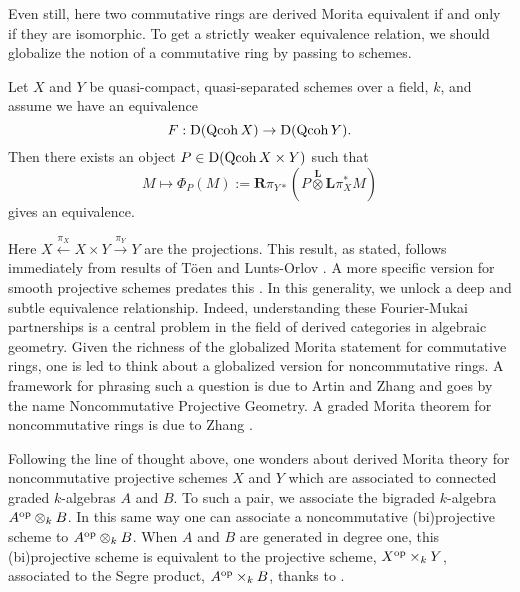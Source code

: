\documentclass[dissertation.tex]{subfiles}
\begin{document}
Even still, here two commutative rings are derived Morita equivalent if and only if they are isomorphic. To get a strictly weaker equivalence relation, we should globalize the notion of a commutative ring by passing to schemes. 

\begin{theorem}
  Let \(X\) and \(Y\) be quasi-compact, quasi-separated schemes over a field, \(k\), and assume we have an equivalence 
  \begin{displaymath}
    F: \mathrm{D}(\operatorname{Qcoh}X) \to \mathrm{D}(\operatorname{Qcoh}Y).
  \end{displaymath}
  Then there exists an object \(P \in \mathrm{D}(\operatorname{Qcoh}X \times Y)\) such that
  \begin{displaymath}
    M \mapsto \Phi_P (M) := \mathbf{R}\pi_{Y \ast} \left( P \overset{\mathbf{L}}{\otimes} \mathbf{L}\pi_X^\ast M \right) 
  \end{displaymath}
  gives an equivalence. 
\end{theorem}

Here \(X \overset{\pi_X}\longleftarrow X \times Y \overset{\pi_Y}\longrightarrow Y\) are the projections. This result, as stated, follows immediately from results of T\"oen and Lunts-Orlov \cite{Toen,Lunts-Orlov}. A more specific version for smooth projective schemes predates this \cite{Orlov}. In this generality, we unlock a deep and subtle equivalence relationship. Indeed, understanding these Fourier-Mukai partnerships is a central problem in the field of derived categories in algebraic geometry. 
Given the richness of the globalized Morita statement for commutative rings, one is led to think about a globalized version for noncommutative rings. A framework for phrasing such a question is due to Artin and Zhang \cite{AZ} and goes by the name Noncommutative Projective Geometry. A graded Morita theorem for noncommutative rings is due to Zhang \cite{Zhang}.  


Following the line of thought above, one wonders about derived Morita theory for noncommutative projective schemes \(X\) and \(Y\) which are associated to connected graded \(k\)-algebras \(A\) and \(B\). To such a pair, we associate the bigraded \(k\)-algebra \(A^{\operatorname{op}} \otimes_k B\). In this same way one can associate a noncommutative (bi)projective scheme to \(A^{\operatorname{op}} \otimes_k B\).
When \(A\) and \(B\) are generated in degree one, this (bi)projective scheme is equivalent to the projective scheme, \(X^{\operatorname{op}} \times_k Y\), associated to the Segre product, \(A^{\operatorname{op}} \times_k B\), thanks to \cite[Theorem 2.4]{VR96}.
\end{document}
